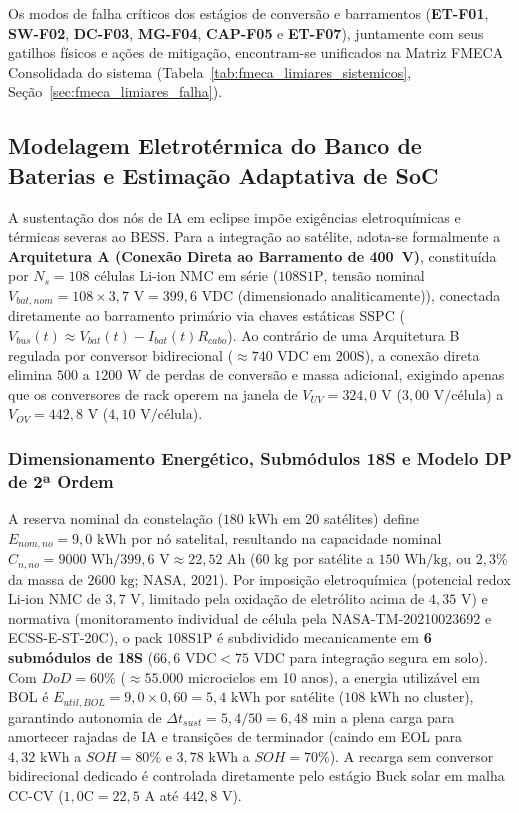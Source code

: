 Os modos de falha críticos dos estágios de conversão e barramentos (\textbf{ET-F01}, \textbf{SW-F02}, \textbf{DC-F03}, \textbf{MG-F04}, \textbf{CAP-F05} e \textbf{ET-F07}), juntamente com seus gatilhos físicos e ações de mitigação, encontram-se unificados na Matriz FMECA Consolidada do sistema (Tabela~\ref{tab:fmeca_limiares_sistemicos}, Seção~\ref{sec:fmeca_limiares_falha}).

\subsection{Modelagem Eletrotérmica do Banco de Baterias e Estimação Adaptativa de SoC}
\label{sec:bess_eletrotermica_aukf}

A sustentação dos nós de IA em eclipse impõe exigências eletroquímicas e térmicas severas ao BESS. Para a integração ao satélite, adota-se formalmente a \textbf{Arquitetura A (Conexão Direta ao Barramento de 400~V)}, constituída por $N_s = 108$ células Li-ion NMC em série ($108\text{S}1\text{P}$, tensão nominal $V_{bat,nom} = 108 \times 3{,}7\text{ V} = 399{,}6\text{ VDC}$ (dimensionado analiticamente)), conectada diretamente ao barramento primário via chaves estáticas SSPC ($V_{bus}(t) \approx V_{bat}(t) - I_{bat}(t) R_{cabo}$). Ao contrário de uma Arquitetura B regulada por conversor bidirecional ($\approx 740\text{ VDC}$ em $200\text{S}$), a conexão direta elimina $500\text{ a }1200\text{ W}$ de perdas de conversão e massa adicional, exigindo apenas que os conversores de rack operem na janela de $V_{UV} = 324{,}0\text{ V}$ ($3{,}00\text{ V/célula}$) a $V_{OV} = 442{,}8\text{ V}$ ($4{,}10\text{ V/célula}$).

\subsubsection{Dimensionamento Energético, Submódulos 18S e Modelo DP de 2ª Ordem}

A reserva nominal da constelação ($180\text{ kWh}$ em 20 satélites) define $E_{nom,no} = 9{,}0\text{ kWh}$ por nó satelital, resultando na capacidade nominal $C_{n,no} = 9000\text{ Wh} / 399{,}6\text{ V} \approx 22{,}52\text{ Ah}$ ($60\text{ kg}$ por satélite a $150\text{ Wh/kg}$, ou $2{,}3\%$ da massa de $2600\text{ kg}$; NASA, 2021). Por imposição eletroquímica (potencial redox Li-ion NMC de $3{,}7\text{ V}$, limitado pela oxidação de eletrólito acima de $4{,}35\text{ V}$) e normativa (monitoramento individual de célula pela NASA-TM-20210023692 e ECSS-E-ST-20C), o pack $108\text{S}1\text{P}$ é subdividido mecanicamente em \textbf{6 submódulos de 18S} ($66{,}6\text{ VDC} < 75\text{ VDC}$ para integração segura em solo). Com $DoD = 60\%$ ($\approx 55.000$ microciclos em 10 anos), a energia utilizável em BOL é $E_{util,BOL} = 9{,}0 \times 0{,}60 = 5{,}4\text{ kWh}$ por satélite ($108\text{ kWh}$ no cluster), garantindo autonomia de $\Delta t_{sust} = 5{,}4 / 50 = 6{,}48\text{ min}$ a plena carga para amortecer rajadas de IA e transições de terminador (caindo em EOL para $4{,}32\text{ kWh}$ a $SOH=80\%$ e $3{,}78\text{ kWh}$ a $SOH=70\%$). A recarga sem conversor bidirecional dedicado é controlada diretamente pelo estágio Buck solar em malha CC-CV ($1{,}0\text{C} = 22{,}5\text{ A}$ até $442{,}8\text{ V}$).

